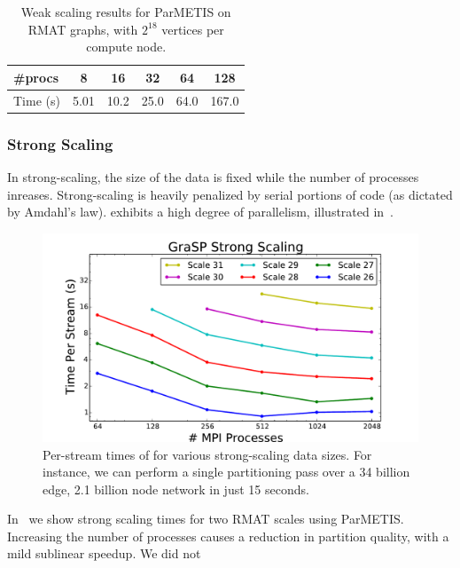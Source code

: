 \begin{table}
\caption{Weak scaling results for ParMETIS on RMAT graphs, with $2^{18}$ vertices per compute node.}
\centering
\small
{ \begin{tabular}{ l | c | c | c | c | c }    \toprule
\label{table:rmat}
\#procs & 8 & 16 & 32 & 64 & 128 \\ \midrule
Time (s) & 5.01 & 10.2 & 25.0 & 64.0 & 167.0 \\
\hline
\end{tabular}\par
}
\label{tab:rmatpmweak}
\end{table}

\subsubsection{Strong Scaling}
In strong-scaling, the size of the data is fixed while the number of processes inreases. 
Strong-scaling is heavily penalized by serial portions of code (as dictated by Amdahl's law). \ourmethod exhibits a high degree of parallelism, illustrated in~. 

\begin{figure}[b!]
\centering
  \includegraphics[width=0.9\columnwidth]{figures/strong_scaling.pdf}
  \caption{Per-stream times of \ourmethod for various strong-scaling data sizes. For instance, we can perform a single partitioning pass over a 34 billion edge, 2.1 billion node network in just 15 seconds.}
  \label{fig:kronspeed_strong}
\end{figure}

In~ we show strong scaling times for two RMAT scales using ParMETIS. Increasing the number of processes causes a reduction in partition quality, with a mild sublinear speedup. We did not 

